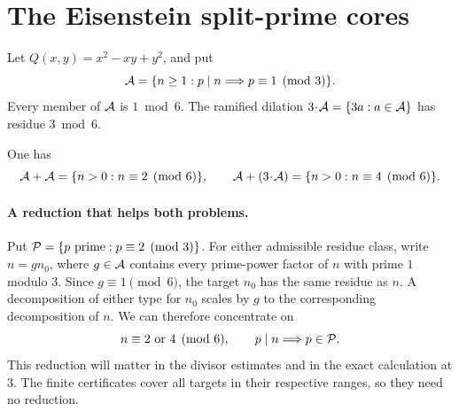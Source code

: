 \section{The Eisenstein split-prime cores}
Let $Q(x,y)=x^2-xy+y^2$, and put
\[
 \AA=\{n\ge1:p\mid n\Longrightarrow p\equiv1\pmod3\}.
\]
Every member of $\AA$ is $1\bmod6$.  The ramified dilation
$3\!\cdot\!\AA=\{3a:a\in\AA\}$ has residue $3\bmod6$.

\begin{theorem}\label{thm:main}
One has
\[
 \AA+\AA=\{n>0:n\equiv2\pmod6\},\qquad
 \AA+(3\!\cdot\!\AA)=\{n>0:n\equiv4\pmod6\}.
\]
\end{theorem}

\paragraph{A reduction that helps both problems.}
Put $\PP=\{p\text{ prime}:p\equiv2\pmod3\}$. For either admissible residue
class, write $n=gn_0$, where $g\in\AA$ contains every prime-power factor
of $n$ with prime $1$ modulo $3$. Since $g\equiv1\pmod6$, the target
$n_0$ has the same residue as $n$. A decomposition of either type for
$n_0$ scales by $g$ to the corresponding decomposition of $n$.
We can therefore concentrate on
\begin{equation}\label{eq:reduced}
n\equiv2\text{ or }4\pmod6,\qquad
p\mid n\Longrightarrow p\in\PP.
\end{equation}
This reduction will matter in the divisor estimates and in the exact
calculation at $3$. The finite certificates cover all targets in their
respective ranges, so they need no reduction.
